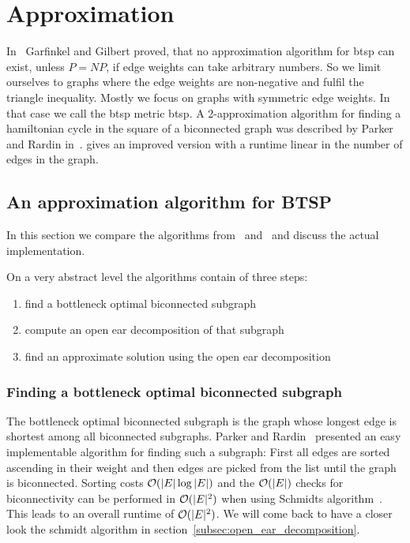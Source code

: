 \chapter{Approximation}

In~\cite{garfinkel1978} Garfinkel and Gilbert proved, that no approximation algorithm for \gls{btsp} can exist, unless \(P = NP\), if edge weights can take arbitrary numbers. So we limit ourselves to graphs where the edge weights are non-negative and fulfil the triangle inequality. Mostly we focus on graphs with symmetric edge weights. In that case we call the \gls{btsp} metric \gls{btsp}.
A 2-approximation algorithm for finding a hamiltonian cycle in the square of a biconnected graph was described by Parker and Rardin in~\cite{ParkerRardin1984}. \cite{alstrup2018hamiltonian} gives an improved version with a runtime linear in the number of edges in the graph.

\section{An approximation algorithm for BTSP}
In this section we compare the algorithms from~\cite{ParkerRardin1984} and~\cite{alstrup2018hamiltonian} and discuss the actual implementation.

On a very abstract level the algorithms contain of three steps:
\begin{enumerate}
  \item find a bottleneck optimal biconnected subgraph
  \item compute an open ear decomposition of that subgraph
  \item find an approximate solution using the open ear decomposition\label{enum:approximate}
\end{enumerate}

\subsection{Finding a bottleneck optimal biconnected subgraph}
The bottleneck optimal biconnected subgraph is the graph whose longest edge is shortest among all biconnected subgraphs.
Parker and Rardin~\cite{ParkerRardin1984} presented an easy implementable algorithm for finding such a subgraph: First all edges are sorted ascending in their weight and then edges are picked from the list until the graph is biconnected. Sorting costs \(\mathcal{O}(\vert E \vert \log \vert E \vert)\) and the \(\mathcal{O}(\vert E \vert)\) checks for biconnectivity can be performed in \(\mathcal{O}(\vert E \vert^2)\) when using Schmidts algorithm~\cite{schmidt2013}. This leads to an overall runtime of \(\mathcal{O}(\vert E \vert^2)\). We will come back to have a closer look the schmidt algorithm in section~\ref{subsec:open_ear_decomposition}.

